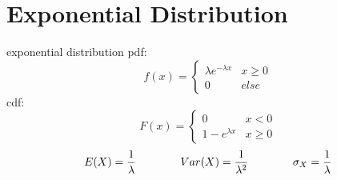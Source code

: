 \section{Exponential Distribution}  %
exponential distribution pdf:\begin{equation}
    f(x)=\begin{cases}
        \lambda e^{-\lambda x} & x \geq 0\\
        0 & else
    \end{cases}
\end{equation}
cdf:\begin{equation}
    F(x)=\begin{cases}
        0 & x<0 \\
        1-e^{\lambda x} & x\geq 0
    \end{cases}
\end{equation}
\begin{equation}
    E(X)=\frac{1}{\lambda} \qquad\qquad Var(X) = \frac{1}{\lambda^2} \qquad\qquad \sigma_X =\frac{1}{\lambda}
\end{equation}
